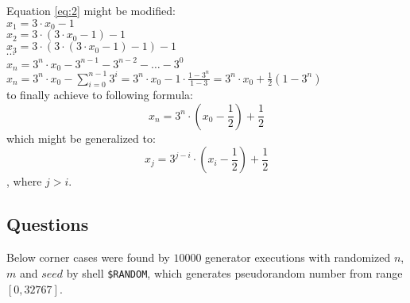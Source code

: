 \documentclass[a4paper,10pt]{article}
\begin{document}
Equation \ref{eq:2} might be modified: \\
 $x_1 = 3 \cdot x_0 -1$ \\
 $x_2 = 3 \cdot (3 \cdot x_0 - 1) -1$ \\
 $x_3 = 3 \cdot (3 \cdot (3 \cdot x_0 -1) - 1) -1$ \\
 $\cdots$ \\
 $x_n = 3^n \cdot x_0 - 3^{n-1} - 3^{n-2} - \ldots - 3^0$ \\
 $x_n = 3^n \cdot x_0 - \sum_{i=0}^{n-1} 3^i = 3^n \cdot x_0 - 1 \cdot \frac{1-3^n}{1-3} = 3^n \cdot x_0 + \frac{1}{2}(1-3^n)$ \\
 to finally achieve to following formula:
\begin{equation}
 \label{eq:22}
 x_n = 3^n \cdot (x_0 - \frac{1}{2}) + \frac{1}{2}
 \end{equation}
which might be generalized to:
\begin{equation}
 \label{eq:23}
 x_j = 3^{j-i} \cdot (x_i - \frac{1}{2}) + \frac{1}{2}
 \end{equation}
 , where $j>i$.

 
\subsection{Questions}
Below corner cases were found by $10000$ generator executions with randomized $n$, $m$ and $seed$ by shell \texttt{\$RANDOM}, which generates pseudorandom number from range $[0,32767]$.
\\
\end{document}
